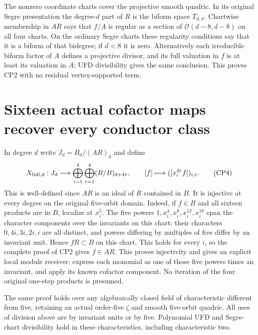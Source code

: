 \documentclass[11pt]{article}
\begin{document}
The nonzero coordinate charts cover the projective smooth quadric.
In its original Segre presentation the degree-$d$ part of $R$ is
the biform space $T_{d,d}$. Chartwise membership in $AR$ says
that $f/A$ is regular as a section of
$\mathcal O(d-8,d-8)$ on all four charts. On the ordinary Segre
charts these regularity conditions say that it is a biform of that
bidegree; if $d<8$ it is zero. Alternatively each irreducible
biform factor of $A$ defines a projective divisor, and its full
valuation in $f$ is at least its valuation in $A$; UFD divisibility
gives the same conclusion. This proves CP2 with no residual
vertex-supported term.

\section{Sixteen actual cofactor maps recover every conductor class}
In degree $d$ write $J_d=B_d/(AR)_d$ and define
\[
 X_{{\rm full},d}:J_d\longrightarrow
       \bigoplus_{i=1}^4\bigoplus_{r=1}^4(R/B)_{d+4r},\qquad
 [f]\longmapsto([x_i^{4r}f])_{i,r}.                                \tag{CP4}
\]
This is well-defined since $AR$ is an ideal of $R$ contained in $B$.
It is injective at every degree on the original five-orbit domain.
Indeed, if $f\in B$ and all sixteen products are in $B$, localize
at $x_i^5$. The five powers $1,x_i^4,x_i^8,x_i^{12},x_i^{16}$
span the character components over the invariants on this chart:
their characters $0,4i,3i,2i,i$ are all distinct, and powers differing
by multiples of five differ by an invariant unit. Hence $fR\subset B$
on this chart. This holds for every $i$, so the complete proof of
CP2 gives $f\in AR$. This proves injectivity and gives an explicit
local module receiver: express each monomial as one of those five
powers times an invariant, and apply its known cofactor component.
No iteration of the four original one-step products is presumed.

The same proof holds over any algebraically closed field of
characteristic different from five, retaining an actual order-five
$\zeta$ and smooth five-orbit quadric. All uses of division above
are by invariant units or by five. Polynomial UFD and Segre-chart
divisibility hold in these characteristics, including characteristic two.
\end{document}
